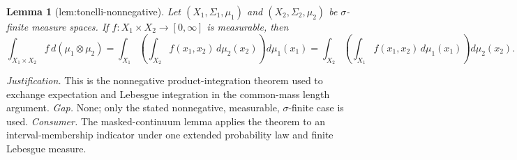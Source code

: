 \documentclass{article}
\newtheorem{lemma}{Lemma}
\begin{document}
\begin{lemma}[lem:tonelli-nonnegative]\label{lem:tonelli-nonnegative}
Let \((X_1,\Sigma_1,\mu_1)\) and \((X_2,\Sigma_2,\mu_2)\) be \(\sigma\)-finite measure spaces.  If \(f:X_1\times X_2\to[0,\infty]\) is measurable, then
\[
 \int_{X_1\times X_2} f\,d(\mu_1\otimes\mu_2)
 =\int_{X_1}\!\left(\int_{X_2}f(x_1,x_2)\,d\mu_2(x_2)\right)d\mu_1(x_1)
 =\int_{X_2}\!\left(\int_{X_1}f(x_1,x_2)\,d\mu_1(x_1)\right)d\mu_2(x_2).
\]
\end{lemma}
\par\smallskip\noindent \textit{Justification.} This is the nonnegative product-integration theorem used to exchange expectation and Lebesgue integration in the common-mass length argument. \textit{Gap.} None; only the stated nonnegative, measurable, \(\sigma\)-finite case is used. \textit{Consumer.} The masked-continuum lemma applies the theorem to an interval-membership indicator under one extended probability law and finite Lebesgue measure.
\end{document}
